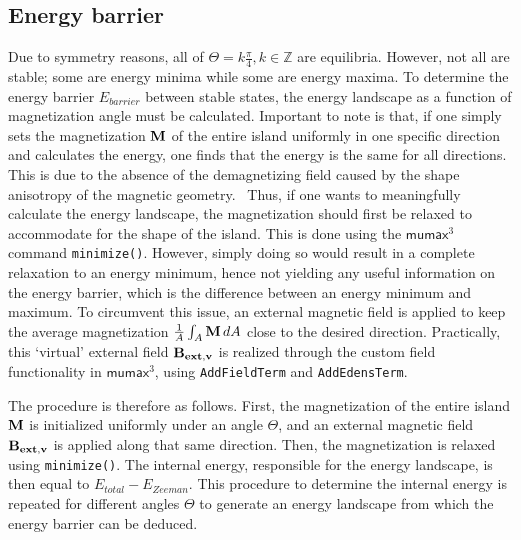 \documentclass[11pt,a4paper,english]{article}
\newcommand{\code}[1]{\texttt{#1}}
\newcommand{\mumax}{$\mathsf{mumax}^3$}
\begin{document}
\subsection{Energy barrier}
\label{par:Biaxial_EnergyBarrier}
Due to symmetry reasons, all of $\Theta = k\frac{\pi}{4} , k\in\mathbb{Z}$ are equilibria. However, not all are stable; some are energy minima while some are energy maxima. To determine the energy barrier $E_{barrier}$ between stable states, the energy landscape as a function of magnetization angle must be calculated. Important to note is that, if one simply sets the magnetization $\vb{M}$ of the entire island uniformly in one specific direction and calculates the energy, one finds that the energy is the same for all directions. This is due to the absence of the demagnetizing field caused by the shape anisotropy of the magnetic geometry.~\cite{Nonmonotonic_reversal} Thus, if one wants to meaningfully calculate the energy landscape, the magnetization should first be relaxed to accommodate for the shape of the island. This is done using the \mumax{} command \code{minimize()}. However, simply doing so would result in a complete relaxation to an energy minimum, hence not yielding any useful information on the energy barrier, which is the difference between an energy minimum and maximum. To circumvent this issue, an external magnetic field is applied to keep the average magnetization $\frac{1}{A}\int_A \vb{M}\,dA$ close to the desired direction. Practically, this `virtual' external field $\vb{B_{ext,v}}$ is realized through the custom field functionality in \mumax{}, using \code{AddFieldTerm} and \code{AddEdensTerm}. \par
The procedure is therefore as follows. First, the magnetization of the entire island $\vb{M}$ is initialized uniformly under an angle $\Theta$, and an external magnetic field $\vb{B_{ext,v}}$ is applied along that same direction. Then, the magnetization is relaxed using \code{minimize()}. The internal energy, responsible for the energy landscape, is then equal to $E_{total} - E_{Zeeman}$. This procedure to determine the internal energy is repeated for different angles $\Theta$ to generate an energy landscape from which the energy barrier can be deduced.
\end{document}
